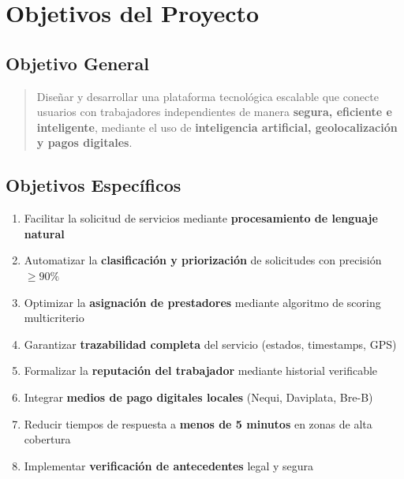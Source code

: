 \documentclass[12pt,a4paper,spanish]{article}
\begin{document}
\newpage

\section{Objetivos del Proyecto}

\subsection{Objetivo General}

\begin{quotation}
    \noindent Diseñar y desarrollar una plataforma tecnológica escalable que conecte usuarios con trabajadores independientes de manera \textbf{segura, eficiente e inteligente}, mediante el uso de \textbf{inteligencia artificial, geolocalización y pagos digitales}.
\end{quotation}

\subsection{Objetivos Específicos}

\begin{enumerate}
    \item Facilitar la solicitud de servicios mediante \textbf{procesamiento de lenguaje natural}

    \item Automatizar la \textbf{clasificación y priorización} de solicitudes con precisión $\geq 90\%$

    \item Optimizar la \textbf{asignación de prestadores} mediante algoritmo de scoring multicriterio

    \item Garantizar \textbf{trazabilidad completa} del servicio (estados, timestamps, GPS)

    \item Formalizar la \textbf{reputación del trabajador} mediante historial verificable

    \item Integrar \textbf{medios de pago digitales locales} (Nequi, Daviplata, Bre-B)

    \item Reducir tiempos de respuesta a \textbf{menos de 5 minutos} en zonas de alta cobertura

    \item Implementar \textbf{verificación de antecedentes} legal y segura
\end{enumerate}
\end{document}
